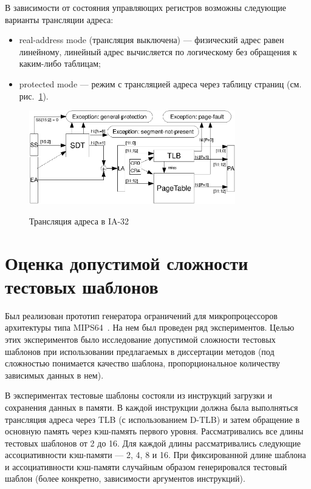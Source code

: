 В зависимости от состояния управляющих регистров возможны следующие варианты
трансляции адреса:
\begin{itemize}
  \item real-address mode (трансляция выключена) --- физический адрес равен
линейному, линейный адрес вычисляется по логическому без обращения к каким-либо
таблицам;
  \item protected mode --- режим с трансляцией адреса через таблицу страниц (см.
рис.~\ref{fig:ia32_address_translation}).
\end{itemize}

\begin{figure}[h] \center
  \includegraphics[width=0.8\textwidth]{4.analysis/ia32_addrtrans}\\
  \caption{Трансляция адреса в IA-32}\label{fig:ia32_address_translation}
\end{figure}

\section{Оценка допустимой сложности тестовых шаблонов}\label{sec:templates_estimation}


Был реализован прототип генератора ограничений для микропроцессоров архитектуры
типа MIPS64~\cite{mips64_II}. На нем был проведен ряд экспериментов. Целью этих
экспериментов было исследование допустимой сложности тестовых шаблонов при
использовании предлагаемых в диссертации методов (под сложностью понимается
качество шаблона, пропорциональное количеству зависимых данных в нем).

В экспериментах тестовые шаблоны состояли из инструкций загрузки и сохранения
данных в памяти. В каждой инструкции должна была выполняться трансляция адреса
через TLB (с использованием D-TLB) и затем обращение в основную память через
кэш-память первого уровня. Рассматривались все длины тестовых шаблонов от 2 до
16. Для каждой длины рассматривались следующие ассоциативности кэш-памяти --- 2,
4, 8 и 16. При фиксированной длине шаблона и ассоциативности кэш-памяти
случайным образом генерировался тестовый шаблон (более конкретно, зависимости
аргументов инструкций).

